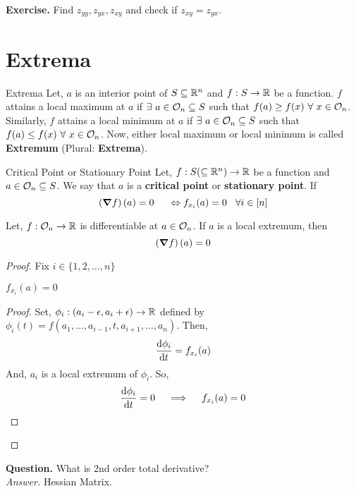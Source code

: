 \documentclass[../Analysis-3]{subfiles}
\begin{document}
\textbf{Exercise.} Find $z_{yy}, z_{yx}, z_{xy}$ and check if $z_{xy} = z_{yx}$.

\section{Extrema}

\begin{Def}{Extrema}{}
    Let, $a$ is an interior point of $S \subseteq \mathbb{R}^n$ and $f : S \to \mathbb{R}$ be a function. $f$ attains a local maximum at $a$ if $\exists\ a \in \mathcal{O}_{n} \subseteq S$ such that $f(a) \geq f(x)\ \forall\ x \in \mathcal{O}_{n}$. Similarly, $f$ attains a local minimum at $a$ if $\exists\ a \in \mathcal{O}_{n} \subseteq S$ such that $f(a) \leq f(x)\ \forall\ x \in \mathcal{O}_{n}$. Now, either local maximum or local minimum is called \textbf{Extremum} (Plural: \textbf{Extrema}).
\end{Def}

\begin{Def}{Critical Point or Stationary Point}{}
    Let, $f : S (\subseteq \mathbb{R}^n) \to \mathbb{R}$ be a function and $a \in \mathcal{O}_{n} \subseteq S$. We say that $a$ is a \textbf{critical point} or \textbf{stationary point}.
    If \[ \left(\grad f\right)(a) = 0 \hspace{5mm} \Leftrightarrow f_{x_i}(a) = 0 \hspace{3mm} \forall i \in [n] \]
\end{Def}

\begin{Thm}{}{}
    Let, $f: \mathcal{O}_{n} \to \mathbb{R}$ is differentiable at $a \in \mathcal{O}_{n}$. If $a$ is a local extremum, then \[ \left(\grad f\right)(a) = 0 \]
\end{Thm}

\begin{proof}
    Fix $i \in \{1,2, \ldots, n\}$

    \begin{clmBox}
        $f_{x_i}(a) = 0$
    \end{clmBox}

    \begin{proof}
        Set, $\phi_i : (a_i - \epsilon, a_i + \epsilon) \to \mathbb{R}$ defined by $\phi_i(t) = f(a_1, \ldots, a_{i-1}, t, a_{i+1}, \ldots, a_n)$. Then, \[ \dv{\phi_i}{t}(a_i) = f_{x_i}(a) \]
        And, $a_i$ is a local extremum of $\phi_i$. So, \[ \dv{\phi_i}{t}(a_i) = 0 \quad \implies \quad f_{x_i}(a) = 0 \]
    \end{proof}
\end{proof}


\textbf{Question.} What is 2nd order total derivative? \\
\textit{Answer.} Hessian Matrix.
\end{document}
